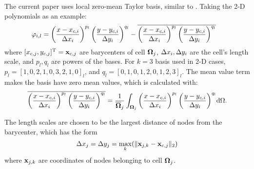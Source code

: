 The current paper uses local zero-mean Taylor basis, similar to
\cite{wang2017compact_VR}.
Taking the 2-D polynomials as an example:
\begin{equation}
    \begin{aligned}
        \varphi_{i,l} & =
        \left(\frac{x - x_{c,i}}{{\Delta} x_i}\right)^{p_l}
        \left(\frac{y - y_{c,i}}{{\Delta} y_i}\right)^{q_l}
        -
        \overline{
            \left(\frac{x - x_{c,i}}{{\Delta} x_i}\right)^{p_l}
            \left(\frac{y - y_{c,i}}{{\Delta} y_i}\right)^{q_l}
        }
    \end{aligned}
\end{equation}
where $[x_{c,j},y_{c,j}]^\mathrm{T} = \mathbf{x}_{c,j}$ are barycenters of cell $\mathbf{\Omega}_{j}$,
${\Delta} x_i,{\Delta} y_i$ are the cell's length scale, and $p_l,q_l$ are
powers of the bases. For $k=3$ basis used in 2-D cases,
$p_l=[1,0,2,1,0,3,2,1,0]_l$,
and $q_l=[0,1,0,1,2,0,1,2,3]_l$.
The mean value term makes the basis have zero mean values,
which is calculated with:
\begin{equation}
    \overline{
        \left(\frac{x - x_{c,i}}{{\Delta} x_i}\right)^{p_l}
        \left(\frac{y - y_{c,i}}{{\Delta} y_i}\right)^{q_l}
    }
    =
    \frac{1}{\overline{\mathbf{\Omega}}_j}\int_{\mathbf{\Omega}_j}{
        \left(\frac{x - x_{c,i}}{{\Delta} x_i}\right)^{p_l}
        \left(\frac{y - y_{c,i}}{{\Delta} y_i}\right)^{q_l}
    }\dd \Omega .
\end{equation}

The length scales are chosen to be the largest distance of nodes from the
barycenter, which has the form
\begin{equation}
    {\Delta} x_j = {\Delta} y_j = \max_k(\|\mathbf{x}_{j,k} - \mathbf{x}_{c,j}\|_2)
\end{equation}
where $\mathbf{x}_{j,k}$ are coordinates of nodes belonging to cell $\mathbf{\Omega}_{j}$.


